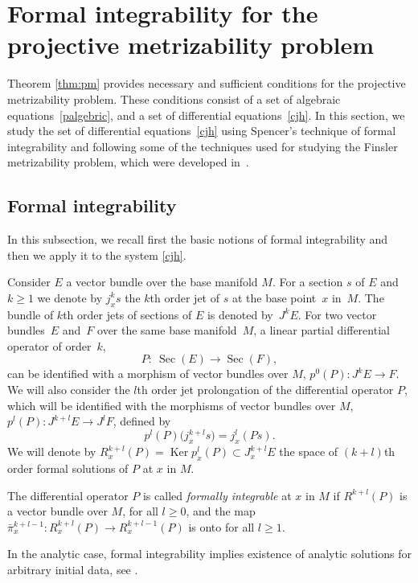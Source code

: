 \section{Formal integrability for the projective metrizability problem}
\label{sec:fi}

Theorem \ref{thm:pm} provides necessary and suf\/f\/icient conditions for the projective
metrizability problem. These conditions consist of a set of algebraic equations~\eqref{palgebric},
and a set of dif\/ferential equations~\eqref{cjh}. In this section,
we study the set of dif\/ferential equations~\eqref{cjh} using Spencer's
technique of formal integrability \cite{BCG91, grifone00}  and following some of the techniques
used for studying the Finsler metrizability problem, which were developed in~\cite{muzsnay06}.


\subsection{Formal integrability} \label{subsec:fi}
In this subsection, we recall f\/irst the basic notions of formal integrability
\cite{BCG91, grifone00} and then we apply it to the system \eqref{cjh}.

Consider $E$ a vector bundle over the base manifold $M$. For a
section $s$ of $E$ and $k\geq 1$ we denote by $j^k_xs$ the $k$th
order jet of $s$ at the base point~$x$ in~$M$. The bundle of $k$th
order jets of sections of $E$ is denoted by~$J^kE$. For two vector
bundles~$E$ and~$F$ over the same base manifold~$M$, a linear
partial dif\/ferential operator of order~$k$,
\[
P: \  \operatorname{Sec}(E) \to \operatorname{Sec}(F),
\]  can be identif\/ied with a morphism of vector
bundles over $M$, $p^{0}(P): J^{k}E \to
F$. We will also consider the $l$th order jet prolongation of the dif\/ferential
operator $P$, which will be identif\/ied with the morphisms of vector bundles
over $M$, $p^{l}(P): J^{k+l}E \to J^lF$, def\/ined by
\[
p^{l}(P)\big(j^{k+l}_xs\big)=j^l_x(Ps).
\] We will denote by
$R^{k+l}_x(P)=\operatorname{Ker} p_x^{l}(P)\subset J^{k+l}_xE$ the
space of $(k+l)$th order formal solutions of $P$ at $x$ in $M$.
\begin{Definition} \label{def:fi} The dif\/ferential operator $P$ is called \emph{formally integrable} at
$x$ in $M$ if $R^{k+l}(P)$ is a vector bundle over $M$, for all $l\geq 0$,
and the map $\bar{\pi}^{k+l-1}_x: R^{k+l}_x(P) \to R^{k+l-1}_x(P)$ is onto for all
$l\geq 1$. \end{Definition}
In the analytic case, formal integrability implies
existence of analytic solutions for arbitrary initial data, see
\cite[p.~397]{BCG91}.

